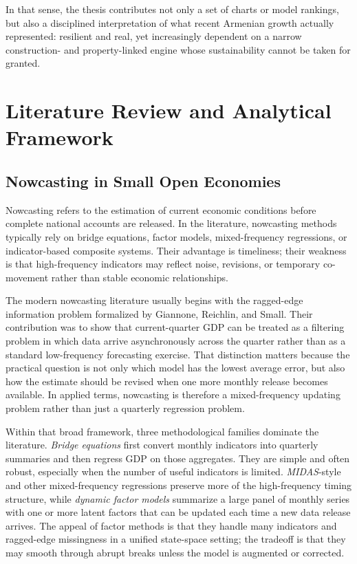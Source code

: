 \documentclass[12pt,a4paper]{report}
\begin{document}
In that sense, the thesis contributes not only a set of charts or model rankings, but also a disciplined interpretation of what recent Armenian growth actually represented: resilient and real, yet increasingly dependent on a narrow construction- and property-linked engine whose sustainability cannot be taken for granted.

\chapter{Literature Review and Analytical Framework}
\section{Nowcasting in Small Open Economies}
Nowcasting refers to the estimation of current economic conditions before complete national accounts are released. In the literature, nowcasting methods typically rely on bridge equations, factor models, mixed-frequency regressions, or indicator-based composite systems. Their advantage is timeliness; their weakness is that high-frequency indicators may reflect noise, revisions, or temporary co-movement rather than stable economic relationships.

The modern nowcasting literature usually begins with the ragged-edge information problem formalized by Giannone, Reichlin, and Small. Their contribution was to show that current-quarter GDP can be treated as a filtering problem in which data arrive asynchronously across the quarter rather than as a standard low-frequency forecasting exercise.\citep{Giannone2008} That distinction matters because the practical question is not only which model has the lowest average error, but also how the estimate should be revised when one more monthly release becomes available. In applied terms, nowcasting is therefore a mixed-frequency updating problem rather than just a quarterly regression problem.

Within that broad framework, three methodological families dominate the literature. \textit{Bridge equations} first convert monthly indicators into quarterly summaries and then regress GDP on those aggregates. They are simple and often robust, especially when the number of useful indicators is limited. \textit{MIDAS}-style and other mixed-frequency regressions preserve more of the high-frequency timing structure, while \textit{dynamic factor models} summarize a large panel of monthly series with one or more latent factors that can be updated each time a new data release arrives.\citep{Giannone2008,Bok2017} The appeal of factor methods is that they handle many indicators and ragged-edge missingness in a unified state-space setting; the tradeoff is that they may smooth through abrupt breaks unless the model is augmented or corrected.
\end{document}

